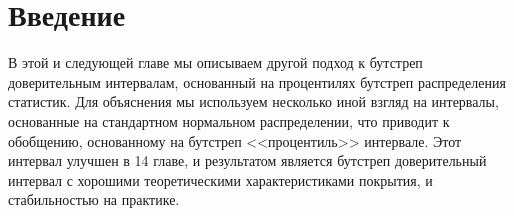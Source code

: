 \section{Введение}
В этой и следующей главе мы описываем другой подход к бутстреп доверительным интервалам, основанный на процентилях бутстреп распределения статистик. Для объяснения мы используем несколько иной взгляд на интервалы, основанные на стандартном нормальном распределении, что приводит к обобщению, основанному на бутстреп <<процентиль>> интервале. Этот интервал улучшен в 14 главе, и результатом является бутстреп доверительный интервал с хорошими теоретическими характеристиками покрытия, и стабильностью на практике.

